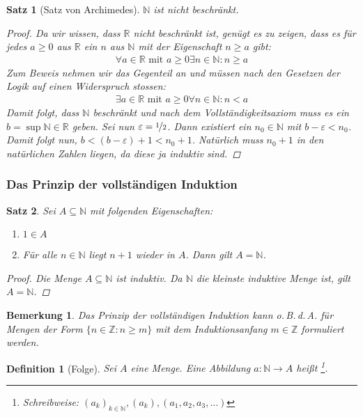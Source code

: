 \documentclass[ngerman,titlepage,twoside, parskip=half*]{scrreprt}
\newcommand*{\N}{\mathbb{N}}
\newcommand*{\Z}{\mathbb{Z}}
\newcommand*{\R}{\mathbb{R}}
\theoremstyle{break}
\newtheorem{theorem}{Satz}[section]
\newtheorem{definition}{Definition}[chapter]
\theoremstyle{nonumberbreak}
\newtheorem{remark}{Bemerkung}
\newtheorem{proof}{Beweis:}
\newcommand*{\highl}[2][]{\textbf{\boldmath{#2}}%
  \ifthenelse{\equal{#1}{}}{\index{#2}}{\index{#1}}%
}
\begin{document}
\begin{theorem}[Satz von Archimedes]
 $\N$ ist nicht beschränkt.
\begin{proof}
  Da wir wissen, dass $\R$ nicht beschränkt ist, genügt es zu zeigen,
  dass es für jedes $a\geq 0$ aus $\R$ ein $n$ aus $\N$ mit der
  Eigenschaft $n\geq a$ gibt:
  \begin{gather*}
    \forall a \in \R\text{ mit } a  \geq 0 \exists n \in \N\colon n \geq a
  \end{gather*}
  Zum Beweis nehmen wir das Gegenteil an und müssen nach den Gesetzen
  der Logik auf einen Widerspruch stossen:
  \begin{gather*}
    \exists a \in \R \text{ mit } a \geq 0\forall n \in \N\colon n < a
  \end{gather*}
  Damit folgt, dass $\N$ beschränkt und nach dem Vollständigkeitsaxiom
  muss es ein $b=\sup\N \in \R$ geben. Sei nun $\varepsilon =
  \nicefrac{1}{2}$. Dann existiert ein $n_0 \in \N$ mit
  $b-\varepsilon<n_0$. Damit folgt nun,
  $b<(b-\varepsilon)+1<n_0+1$. Natürlich muss $n_0+1$ in den
  natürlichen Zahlen liegen, da diese ja induktiv sind. \lightning
\end{proof}
\end{theorem}

\subsubsection{Das Prinzip der vollständigen Induktion}

\begin{theorem}
  Sei $A \subseteq \N$ mit folgenden Eigenschaften:
  \begin{enumerate}
  \item $1 \in A$
  \item Für alle $n \in \N$ liegt $n+1$ wieder in $A$. Dann gilt
    $A=\N$.
  \end{enumerate}
\begin{proof}
  Die Menge $A \subseteq \N$ ist induktiv. Da  $\N$ die kleinste induktive Menge
  ist, gilt  $A=\N$.
\end{proof}
\end{theorem}

\begin{remark}
  Das Prinzip der vollständigen Induktion kann o.\,B.\,d.\,A. für Mengen der
  Form $\{n \in \Z\colon n \geq m\}$ mit dem Induktionsanfang $m \in
  \Z$ formuliert werden.
\end{remark}

\begin{definition}[Folge]
  Sei $A$ eine Menge. Eine Abbildung $a\colon\N \rightarrow A$ heißt
  \highl{Folge}\footnote{Schreibweise: $(a_k)_{k \in \N},
    (a_k), (a_1,a_2,a_3, \ldots)$}.
\end{definition}
\end{document}
